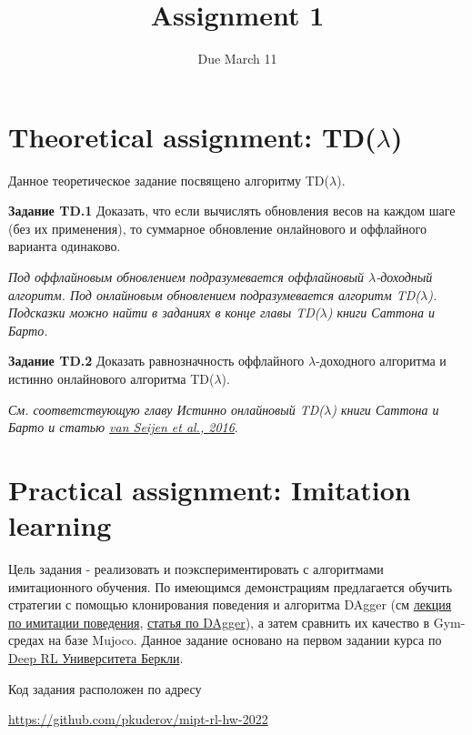 \documentclass[12pt, oneside]{article}
\author{Due March 11}
\title{Assignment 1}
\date{}
\begin{document}
\maketitle
\thispagestyle{fancy}

\section{Theoretical assignment: TD($\lambda$)}

Данное теоретическое задание посвящено алгоритму TD($\lambda$).

\textbf{Задание TD.1} Доказать, что если вычислять обновления весов на каждом шаге (без их применения), то суммарное обновление онлайнового и оффлайного варианта одинаково.

\textit{Под оффлайновым обновлением подразумевается оффлайновый $\lambda$-доходный алгоритм. Под онлайновым обновлением подразумевается алгоритм TD($\lambda$). Подсказки можно найти в заданиях в конце главы TD($\lambda$) книги Саттона и Барто.}

\textbf{Задание TD.2} Доказать равнозначность оффлайного $\lambda$-доходного алгоритма и истинно онлайнового алгоритма TD($\lambda$).

\textit{См. соответствующую главу Истинно онлайновый TD($\lambda$) книги Саттона и Барто и статью \href{https://www.jmlr.org/papers/volume17/15-599/15-599.pdf}{van Seijen et al., 2016}}.

\section{Practical assignment: Imitation learning}

Цель задания - реализовать и поэкспериментировать с алгоритмами имитационного обучения. По имеющимся демонстрациям предлагается обучить стратегии с помощью клонирования поведения и алгоритма DAgger (см \href{https://youtu.be/HUzyjOsd2PA?list=PL_iWQOsE6TfURIIhCrlt-wj9ByIVpbfGc}{лекция по имитации поведения}, \href{http://proceedings.mlr.press/v15/ross11a/ross11a.pdf}{статья по DAgger}), а затем сравнить их качество в Gym-средах на базе Mujoco. Данное задание основано на первом задании курса по \href{http://rail.eecs.berkeley.edu/deeprlcourse/}{Deep RL Университета Беркли}.

Код задания расположен по адресу
\begin{center}
    \href{https://github.com/pkuderov/mipt-rl-hw-2022}{https://github.com/pkuderov/mipt-rl-hw-2022}
\end{center}
\end{document}
